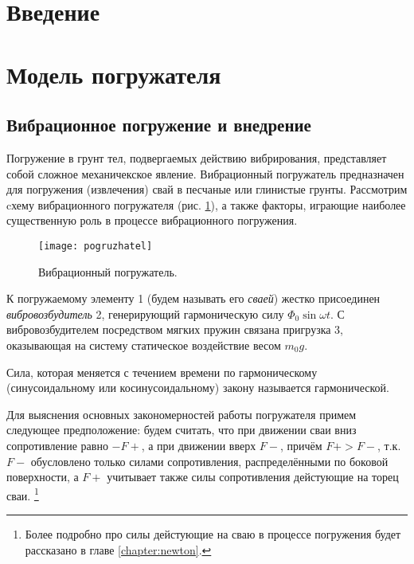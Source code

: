 \section{Введение}

\clearpage

\section{Модель погружателя}

\subsection{Вибрационное погружение и внедрение}

Погружение в грунт тел, подвергаемых действию вибрирования, представляет собой сложное механичекское явление. Вибрационный
погружатель предназначен для погружения (извлечения) свай в песчаные или глинистые грунты. Рассмотрим cхему вибрационного
погружателя (рис. \ref{fig:vp}), а также факторы, играющие наиболее существенную роль в процессе вибрационного погружения.

\begin{figure}[h]
    \centering
    \texttt{[image: pogruzhatel]}
    \caption{Вибрационный погружатель.}
    \label{fig:vp}
\end{figure}

\noindent К погружаемому элементу 1 (будем называть его \textit{сваей}) жестко присоединен \textit{вибровозбудитель} 2,
генерирующий гармоническую силу $\Phi_0 \sin \omega t$. С вибровозбудителем посредством мягких пружин связана пригрузка 3,
оказывающая на систему статическое воздействие весом $m_0g$.

\begin{definition}
    Сила, которая меняется с течением времени по гармоническому (синусоидальному или косинусоидальному)
    закону называется гармонической.
\end{definition}

Для выяснения основных закономерностей работы погружателя примем следующее предположение: будем считать, что
при движении сваи вниз сопротивление равно $-F+$, а при движении вверх $F-$, причём $F+ > F-$, т.к. $F-$ обусловлено только
силами сопротивления, распределёнными по боковой поверхности, а $F+$ учитывает также силы сопротивления дейстующие на
торец сваи. \footnote{Более подробно про силы дейстующие на сваю в процессе погружения будет рассказано
в главе \ref{chapter:newton}.}

